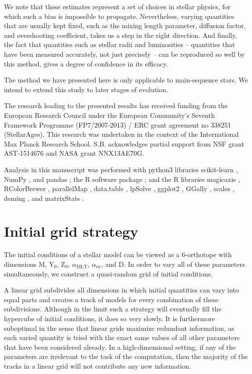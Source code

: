 \documentclass[iop,apj,twocolappendix]{emulateapj}
\begin{document}
We note that these estimates represent a set of choices in stellar physics, for which such a bias is impossible to propagate. Nevertheless, varying quantities that are usually kept fixed, such as the mixing length parameter, diffusion factor, and overshooting coefficient, takes us a step in the right direction. And finally, the fact that quantities such as stellar radii and luminosities -- quantities that have been measured accurately, not just precisely -- can be reproduced so well by this method, gives a degree of confidence in its efficacy. 

The method we have presented here is only applicable to main-sequence stars. We intend to extend this study to later stages of evolution. 


\acknowledgments The research leading to the presented results has received funding from the European Research Council under the European Community's Seventh Framework Programme (FP7/2007-2013) / ERC grant agreement no 338251 (StellarAges). This research was undertaken in the context of the International Max Planck Research School. S.B. acknowledges partial support from NSF grant AST-1514676 and NASA grant NNX13AE70G.

Analysis in this manuscript was performed with python3 libraries scikit-learn \citep{scikit-learn}, NumPy \citep{van2011numpy}, and pandas \citep{mckinney2010data}; the R software package \citep{R}; and the R libraries magicaxis \citep{magicaxis}, RColorBrewer \citep{RColorBrewer}, parallelMap \citep{parallelMap}, data.table \citep{data.table}, lpSolve \citep{lpSolve}, ggplot2 \citep{ggplot2}, GGally \citep{GGally}, scales \citep{scales}, deming \citep{deming}, and matrixStats \citep{matrixStats}. 

\appendix


\section{Initial grid strategy}
\label{sec:grid}
The initial conditions of a stellar model can be viewed as a 6-orthotope with dimensions M, Y$_0$, Z$_0$, $\alpha_{\text{MLT}}$, $\alpha_{\text{ov}}$, and D. In order to vary all of these parameters simultaneously, we construct a quasi-random grid of initial conditions. 

A linear grid subdivides all dimensions in which initial quantities can vary into equal parts and creates a track of models for every combination of these subdivisions. Although in the limit such a strategy will eventually fill the hypercube of initial conditions, it does so very slowly. It is furthermore suboptimal in the sense that linear grids maximize redundant information, as each varied quantity is tried with the exact same values of all other parameters that have been considered already. In a high-dimensional setting, if any of the parameters are irrelevant to the task of the computation, then the majority of the tracks in a linear grid will not contribute any new information.
\end{document}
